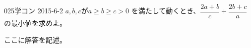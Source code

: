 \begin{prob}{025}{}{学コン 2015-6-2}
 $a,b,c$が$a \ge b \ge c > 0$ を満たして動くとき、$\dfrac{2a+b}{c}+\dfrac{2b+c}{a}$の最小値を求めよ。
\end{prob}
ここに解答を記述。